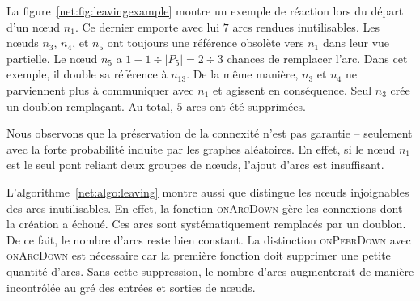 \begin{figure*}
  \centering
  \hspace{40pt}
  \hspace{40pt}
  \caption[Gestion des départs et défaillances dans
  \SPRAY]{\label{net:fig:leavingexample}Exemple de gestion de départs et
    défaillances dans \SPRAY.}
\end{figure*}

La figure~\ref{net:fig:leavingexample} montre un exemple de réaction lors du
départ d'un nœud $n_1$. Ce dernier emporte avec lui $7$ arcs rendues
inutilisables. Les nœuds $n_3$, $n_4$, et $n_5$ ont toujours une référence
obsolète vers $n_1$ dans leur vue partielle. Le nœud $n_5$ a
$1-{1\div{|P_5|}}={2\div{3}}$ chances de remplacer l'arc. Dans cet
exemple, il double sa référence à $n_{13}$. De la même manière, $n_3$ et $n_4$
ne parviennent plus à communiquer avec $n_1$ et agissent en conséquence. Seul
$n_3$ crée un doublon remplaçant. Au total, $5$ arcs ont été supprimées.

Nous observons que la préservation de la connexité n'est pas garantie --
seulement avec la forte probabilité induite par les graphes aléatoires. En
effet, si le nœud $n_1$ est le seul pont reliant deux groupes de nœuds, l'ajout
d'arcs est insuffisant.

L'algorithme~\ref{net:algo:leaving} montre aussi que \SPRAY distingue les nœuds
injoignables des arcs inutilisables. En effet, la fonction \textsc{onArcDown}
gère les connexions dont la création a échoué. Ces arcs sont systématiquement
remplacés par un doublon. De ce fait, le nombre d'arcs reste bien constant. La
distinction \textsc{onPeerDown} avec \textsc{onArcDown} est nécessaire car la
première fonction doit supprimer une petite quantité d'arcs. Sans cette
suppression, le nombre d'arcs augmenterait de manière incontrôlée au gré des
entrées et sorties de nœuds.

